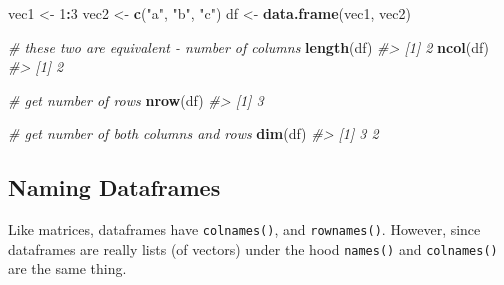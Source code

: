 \documentclass[]{book}
\newenvironment{Shaded}{\begin{snugshade}}{\end{snugshade}}
\newcommand{\CommentTok}[1]{\textcolor[rgb]{0.56,0.35,0.01}{\textit{#1}}}
\newcommand{\DecValTok}[1]{\textcolor[rgb]{0.00,0.00,0.81}{#1}}
\newcommand{\KeywordTok}[1]{\textcolor[rgb]{0.13,0.29,0.53}{\textbf{#1}}}
\newcommand{\NormalTok}[1]{#1}
\newcommand{\OperatorTok}[1]{\textcolor[rgb]{0.81,0.36,0.00}{\textbf{#1}}}
\newcommand{\StringTok}[1]{\textcolor[rgb]{0.31,0.60,0.02}{#1}}
\begin{document}
\begin{Shaded}
\begin{Highlighting}[]
\NormalTok{vec1 <-}\StringTok{ }\DecValTok{1}\OperatorTok{:}\DecValTok{3}
\NormalTok{vec2 <-}\StringTok{ }\KeywordTok{c}\NormalTok{(}\StringTok{"a"}\NormalTok{, }\StringTok{"b"}\NormalTok{, }\StringTok{"c"}\NormalTok{)}
\NormalTok{df <-}\StringTok{ }\KeywordTok{data.frame}\NormalTok{(vec1, vec2)}

\CommentTok{# these two are equivalent - number of columns}
\KeywordTok{length}\NormalTok{(df)}
\CommentTok{#> [1] 2}
\KeywordTok{ncol}\NormalTok{(df)}
\CommentTok{#> [1] 2}

\CommentTok{# get number of rows}
\KeywordTok{nrow}\NormalTok{(df)}
\CommentTok{#> [1] 3}

\CommentTok{# get number of both columns and rows}
\KeywordTok{dim}\NormalTok{(df)}
\CommentTok{#> [1] 3 2}
\end{Highlighting}
\end{Shaded}

\hypertarget{naming-dataframes}{%
\subsection{Naming Dataframes}\label{naming-dataframes}}

Like matrices, dataframes have \texttt{colnames()}, and \texttt{rownames()}. However, since dataframes are really lists (of vectors) under the hood \texttt{names()} and \texttt{colnames()} are the same thing.
\end{document}
